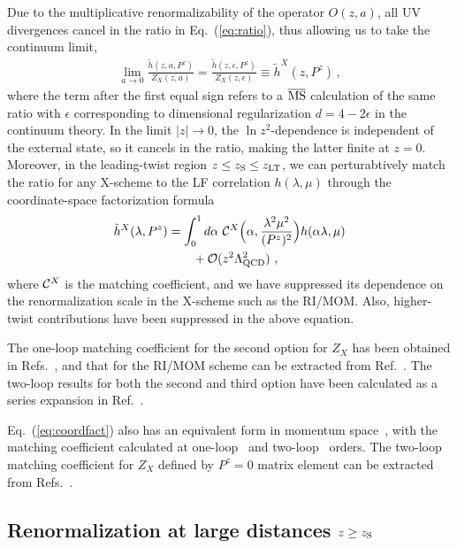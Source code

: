 \documentclass[preprint,12pt]{elsarticle}
\newcommand{\MS}{{\overline{\rm MS}}}
\newcommand{\nn}{\nonumber}
\DeclareRobustCommand{\eq}[1]{Eq.~(\ref{eq:#1})}
\begin{document}
Due to the multiplicative renormalizability of the operator $O(z,a)$, all UV divergences cancel in the ratio in \eq{ratio}, thus allowing us to take the continuum limit,
\begin{align}\label{eq:ratio2}
\lim_{a\to0} \frac{{\tilde h}(z,a,P^z)}{Z_X(z,a)} = \frac{{\tilde h}(z,\epsilon,P^z)}{Z_X(z,\epsilon)} \equiv\tilde h^X(z,P^z)\,,
\end{align}
where the term after the first equal sign refers to a $\MS$
calculation of the same ratio with $\epsilon$ corresponding to dimensional regularization $d=4-2\epsilon$ in the continuum theory. In the limit $|z|\to0$, the $\ln z^2$-dependence is independent of the external state, so it cancels in the ratio, making the latter finite at $z=0$.
Moreover, in the leading-twist region $z\le z_{\rm S} \le z_{\rm LT}$, we can perturabtively match the ratio for any X-scheme to the LF correlation $h(\lambda,\mu)$ through the coordinate-space factorization formula~\cite{Izubuchi:2018srq,Radyushkin:2017lvu}
\begin{align}\label{eq:coordfact}
\tilde h^X(\lambda, P^z) & =\int_{0}^1 d\alpha\ {\cal C}^X\Big(\alpha,\frac{\lambda^2\mu^2}{(P^z)^2}\Big) h(\alpha\lambda,\mu) \nn\\
&\qquad + {\cal O}(z^2\Lambda_{\rm QCD}^2)\ ,
\end{align}
where ${\cal C}^X$ is the matching coefficient, and we have suppressed its dependence on the renormalization scale in the X-scheme such as the RI/MOM. Also, higher-twist contributions have been suppressed in the above equation.

The one-loop matching coefficient for the second option for $Z_X$ has been obtained in Refs.~\cite{Zhang:2018ggy,Radyushkin:2017lvu,Izubuchi:2018srq}, and that for the RI/MOM scheme can be extracted from Ref.~\cite{Constantinou:2017sej,Izubuchi:2018srq}. The two-loop results for both the second and third option have been calculated as a series expansion in Ref.~\cite{Li:2020xml}.

\eq{coordfact} also has an equivalent form in momentum space~\cite{Izubuchi:2018srq}, with the matching coefficient calculated at one-loop~\cite{Stewart:2017tvs,Liu:2018uuj,Liu:2018hxv} and two-loop~\cite{Chen:2020ody} orders.
The two-loop matching coefficient for $Z_X$ defined by $P^z=0$ matrix element can be extracted from Refs.~\cite{Chen:2020ody,Li:2020xml}.


\subsection{Renormalization at large distances $z\ge z_{\rm S}$}
\label{sec:long}
\end{document}
